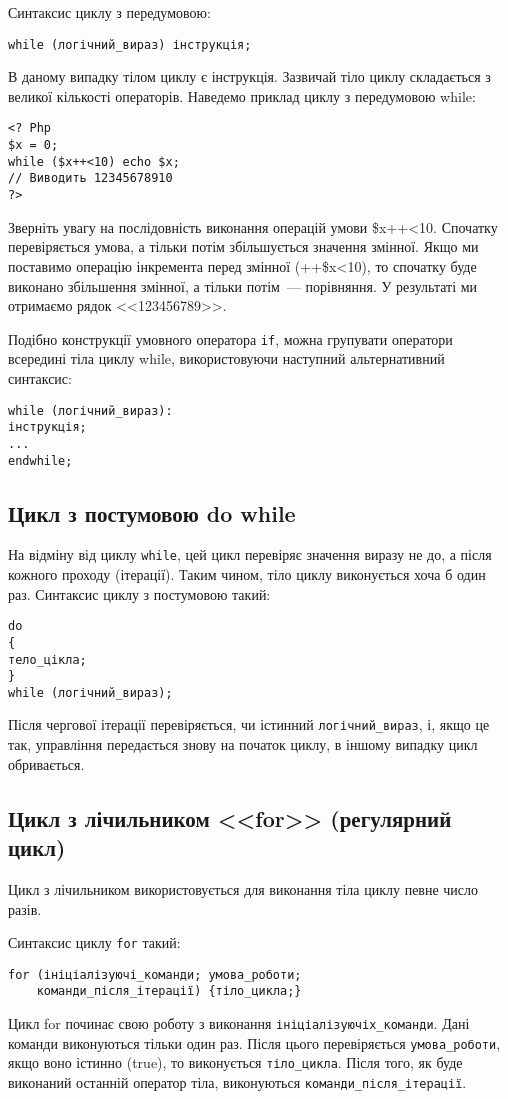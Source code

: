 Синтаксис циклу з передумовою:
\begin{verbatim}
while (логічний_вираз) інструкція;
\end{verbatim}

В даному випадку тілом циклу є інструкція. Зазвичай тіло циклу складається з великої кількості операторів. Наведемо приклад циклу з передумовою while:
\begin{verbatim}
<? Php
$х = 0;
while ($x++<10) echo $x;
// Виводить 12345678910
?>
\end{verbatim}
Зверніть увагу на послідовність виконання операцій умови \$x++<10. Спочатку перевіряється умова, а тільки потім збільшується значення змінної. Якщо ми поставимо операцію інкремента перед змінної (++\$x<10), то спочатку буде виконано збільшення змінної, а тільки потім~--- порівняння. У результаті ми отримаємо рядок <<123456789>>. 


Подібно конструкції умовного оператора \verb'if', можна групувати оператори всередині тіла циклу while, використовуючи наступний альтернативний синтаксис:
\begin{verbatim}
while (логічний_вираз):
інструкція;
...
endwhile;
\end{verbatim}

\subsection*{Цикл з постумовою do while}
На відміну від циклу \verb'while', цей цикл перевіряє значення виразу не до, а після кожного проходу (ітерації). Таким чином, тіло циклу виконується хоча б один раз. Синтаксис циклу з постумовою такий:
\begin{verbatim}
do
{
тело_цікла;
}
while (логічний_вираз);
\end{verbatim}
Після чергової ітерації перевіряється, чи істинний \verb'логічний_вираз', і, якщо це так, управління передається знову на початок циклу, в іншому випадку цикл обривається.

\subsection*{Цикл з лічильником <<for>> (регулярний цикл)}
Цикл з лічильником використовується для виконання тіла циклу певне число разів. 

Синтаксис циклу \verb'for' такий:
\begin{verbatim}
for (ініціалізуючі_команди; умова_роботи; 
	команди_після_ітерації) {тіло_цикла;}
\end{verbatim}
Цикл for починає свою роботу з виконання \verb'ініціалізуючіх_команди'. Дані команди виконуються тільки один раз. Після цього перевіряється \verb'умова_роботи', якщо воно істинно (true), то виконується \verb'тіло_цикла'. Після того, як буде виконаний останній оператор тіла, виконуються \verb'команди_після_ітерації'.



